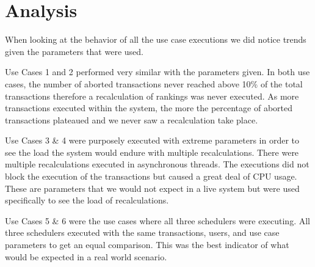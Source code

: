 \section{Analysis}
\label{sec:analysis}

When looking at the behavior of all the use case executions we did notice trends given the parameters that were used.

Use Cases 1 and 2 performed very similar with the parameters given. In both use cases, the number of aborted transactions never reached above 10\% of the total transactions therefore a recalculation of rankings was never executed. As more transactions executed within the system, the more the percentage of aborted transactions plateaued and we never saw a recalculation take place.

Use Cases 3 \& 4 were purposely executed with extreme parameters in order to see the load the system would endure with multiple recalculations. There were multiple recalculations executed in asynchronous threads. The executions did not block the execution of the transactions but caused a great deal of CPU usage. These are parameters that we would not expect in a live system but were used specifically to see the load of recalculations.

Use Cases 5 \& 6 were the use cases where all three schedulers were executing. All three schedulers executed with the same transactions, users, and use case parameters to get an equal comparison. This was the best indicator of what would be expected in a real world scenario.